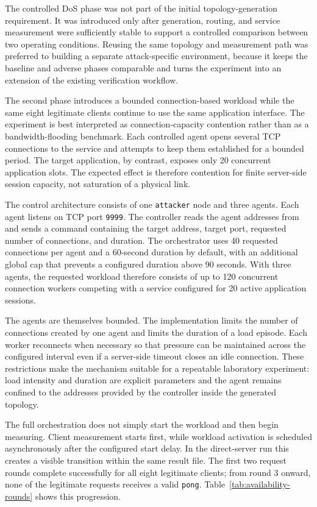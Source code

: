 The controlled DoS phase was not part of the initial topology-generation
requirement. It was introduced only after generation, routing, and service
measurement were sufficiently stable to support a controlled comparison between
two operating conditions. Reusing the same topology and measurement path was
preferred to building a separate attack-specific environment, because it keeps
the baseline and adverse phases comparable and turns the experiment into an
extension of the existing verification workflow.

The second phase introduces a bounded connection-based workload while the same
eight legitimate clients continue to use the same application interface. The
experiment is best interpreted as connection-capacity contention rather than as
a bandwidth-flooding benchmark. Each controlled agent opens several TCP
connections to the service and attempts to keep them established for a bounded
period. The target application, by contrast, exposes only 20 concurrent
application slots. The expected effect is therefore contention for finite
server-side session capacity, not saturation of a physical link.

The control architecture consists of one \texttt{attacker} node and three
agents. Each agent listens on TCP port \texttt{9999}. The controller reads the
agent addresses from  and sends a command containing the
target address, target port, requested number of connections, and duration. The
orchestrator uses 40 requested connections per agent and a 60-second duration
by default, with an additional global cap that prevents a configured duration
above 90 seconds. With three agents, the requested workload therefore consists
of up to 120 concurrent connection workers competing with a service configured
for 20 active application sessions.

The agents are themselves bounded. The implementation limits the number of
connections created by one agent and limits the duration of a load episode.
Each worker reconnects when necessary so that pressure can be maintained across
the configured interval even if a server-side timeout closes an idle
connection. These restrictions make the mechanism suitable for a repeatable
laboratory experiment: load intensity and duration are explicit parameters and
the agent remains confined to the addresses provided by the controller inside
the generated topology.

The full orchestration does not simply start the workload and then begin
measuring. Client measurement starts first, while workload activation is
scheduled asynchronously after the configured start delay. In the direct-server
run this creates a visible transition within the same result file. The
first two request rounds complete successfully for all eight legitimate
clients; from round 3 onward, none of the legitimate requests receives a valid
\texttt{pong}. Table~\ref{tab:availability-rounds} shows this progression.

